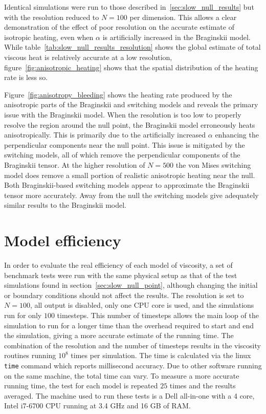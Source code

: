 Identical simulations were run to those described in~\ref{sec:slow_null_results} but with the resolution reduced to $N=100$ per dimension. This allows a clear demonstration of the effect of poor resolution on the accurate estimate of isotropic heating, even when $\alpha$ is artificially increased in the Braginskii model. While table~\ref{tab:slow_null_results_resolution} shows the global estimate of total viscous heat is relatively accurate at a low resolution, figure~\ref{fig:anisotropic_heating} shows that the spatial distribution of the heating rate is less so.

Figure~\ref{fig:anisotropy_bleeding} shows the heating rate produced by the anisotropic parts of the Braginskii and switching models and reveals the primary issue with the Braginskii model. When the resolution is too low to properly resolve the region around the null point, the Braginskii model erroneously heats anisotropically. This is primarily due to the artificially increased $\alpha$ enhancing the perpendicular components near the null point. This issue is mitigated by the switching models, all of which remove the perpendicular components of the Braginskii tensor. At the higher resolution of $N=500$ the von Mises switching model does remove a small portion of realistic anisotropic heating near the null. Both Braginskii-based switching models appear to approximate the Braginskii tensor more accurately. Away from the null the switching models give adequately similar results to the Braginskii model.

\section{Model efficiency}

In order to evaluate the real efficiency of each model of viscosity, a set of benchmark tests were run with the same physical setup as that of the test simulations found in section~\ref{sec:slow_null_point}, although changing the initial or boundary conditions should not affect the results. The resolution is set to $N=100$, all output is disabled, only one CPU core is used, and the simulations run for only $100$ timesteps. This number of timesteps allows the main loop of the simulation to run for a longer time than the overhead required to start and end the simulation, giving a more accurate estimate of the running time. The combination of the resolution and the number of timesteps results in the viscosity routines running $10^{8}$ times per simulation. The time is calculated via the linux \verb|time| command which reports millisecond accuracy. Due to other software running on the same machine, the total time can vary. To measure a more accurate running time, the test for each model is repeated $25$ times and the results averaged. The machine used to run these tests is a Dell all-in-one with a 4 core, Intel i7-6700 CPU running at 3.4 GHz and 16 GB of RAM. 

